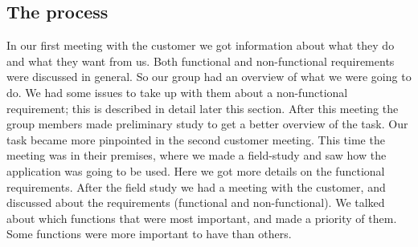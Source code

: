 \subsection{ The process}
	In our first meeting with the customer we got information about what they do and what they want from us. Both functional and non-functional requirements were discussed in general. So our group had an overview of what we were going to do. We had some issues to take up with them about a non-functional requirement; this is described in detail later this section. After this meeting the group members made preliminary study to get a better overview of the task.
\indent Our task became more pinpointed in the second customer meeting. This time the meeting was in their premises, where we made a field-study and saw how the application was going to be used. Here we got more details on the functional requirements. After the field study we had a meeting with the customer, and discussed about the requirements (functional and non-functional). We talked about which functions that were most important, and made a priority of them. Some functions were more important to have than others.
